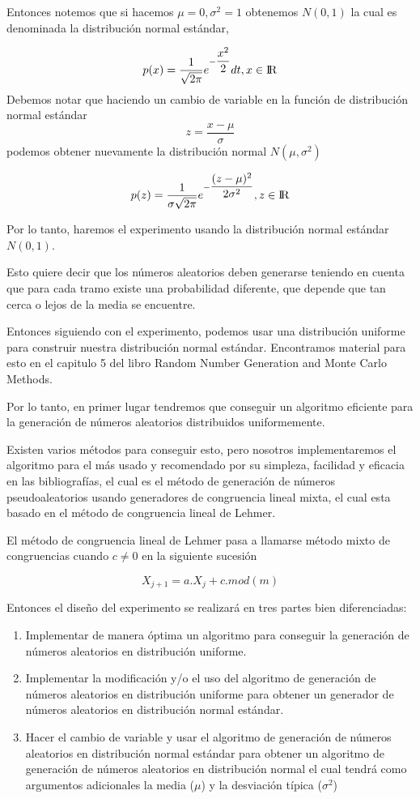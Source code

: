 \documentclass[conference,a4paper]{IEEEtran}
\begin{document}
Entonces notemos que si hacemos $\mu=0,\sigma^2=1$ obtenemos $N(0,1)$
la cual es denominada la distribuci\'on normal est\'andar, 
 
$$p(x) = \dfrac {1}{\sqrt{2\pi}}
e^{-\dfrac{x^2}{2}} dt, x \in {\rm I\!R} $$
Debemos notar que haciendo un cambio de variable en la funci\'on de distribuci\'on normal est\'andar $$z=\dfrac{x-\mu}{\sigma}$$ podemos obtener nuevamente la distribuci\'on normal $N(\mu,\sigma^2)$ 

$$p(z) = \dfrac {1}{\sigma\sqrt{2\pi}}
e^{-\dfrac{(z-\mu)^2}{2\sigma^2}} , z \in {\rm I\!R} $$

Por lo tanto, haremos el experimento usando la distribuci\'on normal est\'andar $N(0,1)$.

Esto quiere decir que los n\'umeros aleatorios deben generarse teniendo en cuenta que para cada tramo existe una probabilidad diferente, que depende que tan cerca o lejos de la media se encuentre.

Entonces siguiendo con el experimento, podemos usar una distribuci\'on uniforme para construir nuestra distribuci\'on normal est\'andar. Encontramos material para esto en el capitulo 5 del libro Random Number Generation and Monte Carlo Methods\cite{b3}.

Por lo tanto, en primer lugar tendremos que conseguir un algoritmo eficiente para la generaci\'on de n\'umeros aleatorios distribuidos uniformemente. 

Existen varios m\'etodos para conseguir esto, pero nosotros implementaremos el algoritmo para el m\'as usado y recomendado por su simpleza, facilidad y eficacia en las bibliograf\'ias, el cual es el m\'etodo de generaci\'on de n\'umeros pseudoaleatorios usando generadores de congruencia lineal mixta, el cual esta basado en el m\'etodo de congruencia lineal de Lehmer.

El m\'etodo de congruencia lineal de Lehmer pasa a llamarse m\'etodo mixto de congruencias cuando $c \not= 0$ en la siguiente sucesi\'on

\begin{equation}
X_{j+1} = a.X_{j}+c.mod(m)
\end{equation}


Entonces el dise\~no del experimento se realizar\'a en tres partes bien diferenciadas:

\begin{enumerate}
    \item Implementar de manera \'optima un algoritmo para conseguir la generaci\'on de n\'umeros aleatorios en distribuci\'on uniforme. 
    \item Implementar la modificaci\'on y/o el uso del algoritmo de generaci\'on de n\'umeros aleatorios en distribuci\'on uniforme para obtener un generador de n\'umeros aleatorios en distribuci\'on normal est\'andar.
    \item Hacer el cambio de variable y usar el algoritmo de generaci\'on de n\'umeros aleatorios en distribuci\'on normal est\'andar para obtener un algoritmo de generaci\'on de n\'umeros aleatorios en distribuci\'on normal el cual tendr\'a como argumentos adicionales la media ($\mu$) y la desviaci\'on t\'ipica ($\sigma^2$)
    
\end{enumerate}
\end{document}
